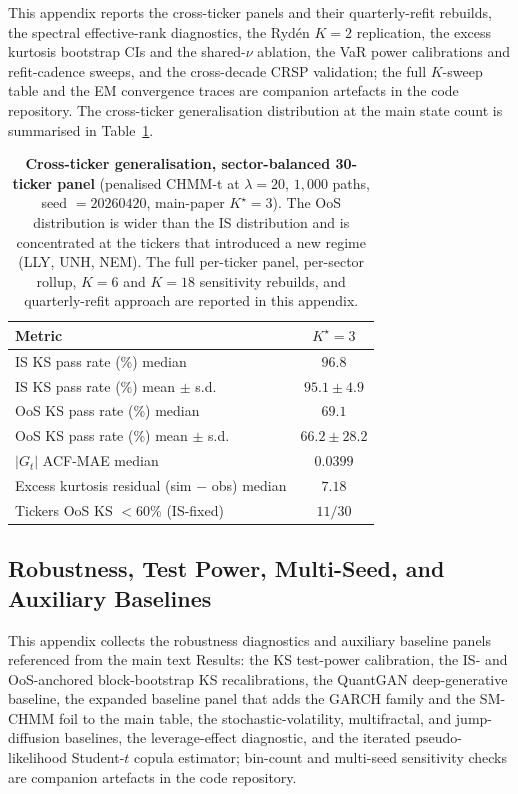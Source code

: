This appendix reports the cross-ticker panels and their quarterly-refit rebuilds, the spectral effective-rank diagnostics, the Ryd\'{e}n $K = 2$ replication, the excess kurtosis bootstrap CIs and the shared-$\nu$ ablation, the VaR power calibrations and refit-cadence sweeps, and the cross-decade CRSP validation; the full $K$-sweep table and the EM convergence traces are companion artefacts in the code repository. The cross-ticker generalisation distribution at the main state count is summarised in Table~\ref{tab:cross_ticker}.

\begin{table}[!ht]
\centering
\small
\caption{\textbf{Cross-ticker generalisation, sector-balanced 30-ticker panel} (penalised CHMM-t at $\lambda = 20$, $1{,}000$ paths, seed $= 20260420$, main-paper $K^\star = 3$). The OoS distribution is wider than the IS distribution and is concentrated at the tickers that introduced a new regime (LLY, UNH, NEM). The full per-ticker panel, per-sector rollup, $K = 6$ and $K = 18$ sensitivity rebuilds, and quarterly-refit approach are reported in this appendix.}
\label{tab:cross_ticker}
\begin{tabular}{l c}
\toprule
Metric & $K^\star = 3$ \\
\midrule
IS KS pass rate (\%) median           & $96.8$ \\
IS KS pass rate (\%) mean $\pm$ s.d.  & $95.1 \pm 4.9$ \\
OoS KS pass rate (\%) median          & $69.1$ \\
OoS KS pass rate (\%) mean $\pm$ s.d. & $66.2 \pm 28.2$ \\
$|G_t|$ ACF-MAE median                & $0.0399$ \\
Excess kurtosis residual (sim $-$ obs) median & $7.18$ \\
Tickers OoS KS $< 60\%$ (IS-fixed)    & $11 / 30$ \\
\bottomrule
\end{tabular}
\end{table}



\subsection{Robustness, Test Power, Multi-Seed, and Auxiliary Baselines}
\label{sec:supp_robustness}

This appendix collects the robustness diagnostics and auxiliary baseline panels referenced from the main text Results: the KS test-power calibration, the IS- and OoS-anchored block-bootstrap KS recalibrations, the QuantGAN deep-generative baseline, the expanded baseline panel that adds the GARCH family and the SM-CHMM foil to the main table, the stochastic-volatility, multifractal, and jump-diffusion baselines, the leverage-effect diagnostic, and the iterated pseudo-likelihood Student-$t$ copula estimator; bin-count and multi-seed sensitivity checks are companion artefacts in the code repository.

